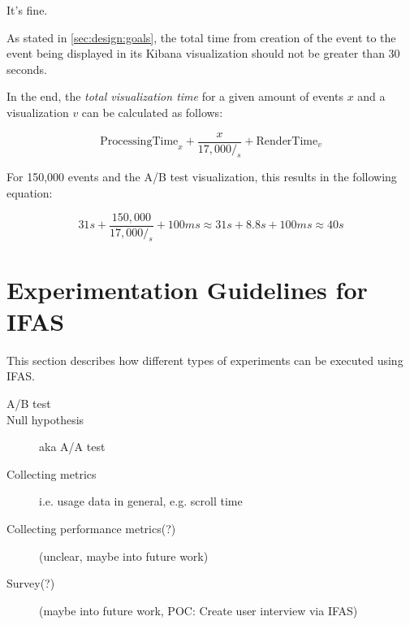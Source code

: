 It's fine.

As stated in \cref{sec:design:goals}, the total time from creation of the event to the event being displayed in its Kibana visualization should not be greater than 30 seconds.

In the end, the \emph{total visualization time} for a given amount of events $x$ and a visualization $v$ can be calculated as follows:

$$ \text{ProcessingTime}_x + \frac{x}{17,000/_s} + \text{RenderTime}_v$$

For 150,000 events and the A/B test visualization, this results in the following equation:

$$ 31s + \frac{150,000}{17,000/_s} + 100ms \approx 31s + 8.8s + 100ms \approx 40s $$


\section{Experimentation Guidelines for IFAS}

This section describes how different types of experiments can be executed using \ac{IFAS}.

\begin{description}
\item[A/B test]
\item[Null hypothesis] aka A/A test \cite{Kohavi2009}
\item[Collecting metrics] i.e. usage data in general, e.g. scroll time
\item[Collecting performance metrics(?)] (unclear, maybe into future work)
\item[Survey(?)] (maybe into future work, POC: Create user interview via \ac{IFAS})
\end{description}

